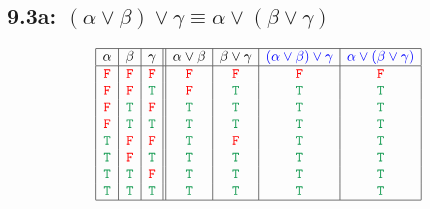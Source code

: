 \documentclass{article}
\begin{document}
\subsection*{9.3a: $(\alpha\lor\beta)\lor\gamma\equiv\alpha\lor(\beta\lor\gamma)$}
\[\begin{array}{|c|c|c||c|c|c|c|}
\hline
\alpha&\beta&\gamma&\alpha\lor\beta&\beta\lor\gamma&\textcolor{blue}{(\alpha\lor\beta)\lor\gamma}&\textcolor{blue}{\alpha\lor(\beta\lor\gamma)}\\
\hline
\textcolor{red}{\tt{F}}&\textcolor{red}{\tt{F}}&\textcolor{red}{\tt{F}}&\textcolor{red}{\tt{F}}&\textcolor{red}{\tt{F}}&\textcolor{red}{\tt{F}}&\textcolor{red}{\tt{F}}\\
\textcolor{red}{\tt{F}}&\textcolor{red}{\tt{F}}&\textcolor{ForestGreen}{\tt{T}}&\textcolor{red}{\tt{F}}&\textcolor{ForestGreen}{\tt{T}}&\textcolor{ForestGreen}{\tt{T}}&\textcolor{ForestGreen}{\tt{T}}\\
\textcolor{red}{\tt{F}}&\textcolor{ForestGreen}{\tt{T}}&\textcolor{red}{\tt{F}}&\textcolor{ForestGreen}{\tt{T}}&\textcolor{ForestGreen}{\tt{T}}&\textcolor{ForestGreen}{\tt{T}}&\textcolor{ForestGreen}{\tt{T}}\\
\textcolor{red}{\tt{F}}&\textcolor{ForestGreen}{\tt{T}}&\textcolor{ForestGreen}{\tt{T}}&\textcolor{ForestGreen}{\tt{T}}&\textcolor{ForestGreen}{\tt{T}}&\textcolor{ForestGreen}{\tt{T}}&\textcolor{ForestGreen}{\tt{T}}\\
\textcolor{ForestGreen}{\tt{T}}&\textcolor{red}{\tt{F}}&\textcolor{red}{\tt{F}}&\textcolor{ForestGreen}{\tt{T}}&\textcolor{red}{\tt{F}}&\textcolor{ForestGreen}{\tt{T}}&\textcolor{ForestGreen}{\tt{T}}\\
\textcolor{ForestGreen}{\tt{T}}&\textcolor{red}{\tt{F}}&\textcolor{ForestGreen}{\tt{T}}&\textcolor{ForestGreen}{\tt{T}}&\textcolor{ForestGreen}{\tt{T}}&\textcolor{ForestGreen}{\tt{T}}&\textcolor{ForestGreen}{\tt{T}}\\
\textcolor{ForestGreen}{\tt{T}}&\textcolor{ForestGreen}{\tt{T}}&\textcolor{red}{\tt{F}}&\textcolor{ForestGreen}{\tt{T}}&\textcolor{ForestGreen}{\tt{T}}&\textcolor{ForestGreen}{\tt{T}}&\textcolor{ForestGreen}{\tt{T}}\\
\textcolor{ForestGreen}{\tt{T}}&\textcolor{ForestGreen}{\tt{T}}&\textcolor{ForestGreen}{\tt{T}}&\textcolor{ForestGreen}{\tt{T}}&\textcolor{ForestGreen}{\tt{T}}&\textcolor{ForestGreen}{\tt{T}}&\textcolor{ForestGreen}{\tt{T}}\\
\hline
\end{array}\]
\end{document}
